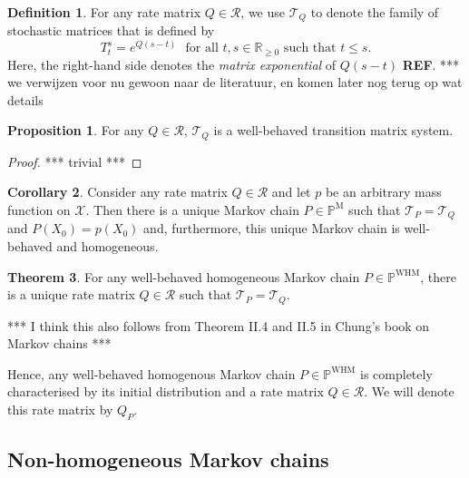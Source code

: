 \documentclass[10pt]{paper}
\theoremstyle{definition}
\newtheorem{theorem}{Theorem}
\newtheorem{proposition}[theorem]{Proposition}
\newtheorem{corollary}[theorem]{Corollary}
\newtheorem{definition}{Definition}
\newcommand{\reals}{\mathbb{R}}
\newcommand{\realsnonneg}{\reals_{\geq 0}}
\newcommand{\states}{\mathcal{X}}
\newcommand{\processes}{\mathbb{P}}
\newcommand{\mprocesses}{\processes^{\mathrm{M}}}
\newcommand{\whmprocesses}{\processes^{\mathrm{WHM}}}
\begin{document}
\begin{definition}\label{def:systemfromQ}For any rate matrix $Q\in\mathcal{R}$, we use $\mathcal{T}_Q$ to denote the family of stochastic matrices that is defined by
\begin{equation*}
T_t^s=e^{Q(s-t)}
\text{~~for all $t,s\in\realsnonneg$ such that $t\leq s$.}
\end{equation*}
Here, the right-hand side denotes the \emph{matrix exponential} of $Q(s-t)$ {\bf REF}. *** we verwijzen voor nu gewoon naar de literatuur, en komen later nog terug op wat details
\end{definition}

\begin{proposition}
\label{prop:systemQ}
For any $Q\in\mathcal{R}$, $\mathcal{T}_Q$ is a well-behaved transition matrix system.
\end{proposition}
\begin{proof}
*** trivial ***
\end{proof}

\begin{corollary}\label{cor:rate_has_unique_homogen_markov_process}
Consider any rate matrix $Q\in\mathcal{R}$ and let $p$ be an arbitrary mass function on $\states$. Then there is a unique Markov chain $P\in\mprocesses$ such that $\mathcal{T}_P=\mathcal{T}_Q$ and $P(X_0)=p(X_0)$ and, furthermore, this unique Markov chain is well-behaved and homogeneous.
\end{corollary}


\begin{theorem}\label{theo:homogeneoushasQ}
For any well-behaved homogeneous Markov chain $P\in\whmprocesses$, there is a unique rate matrix $Q\in\mathcal{R}$ such that $\mathcal{T}_P=\mathcal{T}_Q$.
\end{theorem}

*** I think this also follows from Theorem II.4 and II.5 in Chung's book on Markov chains ***

Hence, any well-behaved homogenous Markov chain $P\in\whmprocesses$ is completely characterised by its initial distribution and a rate matrix $Q\in\mathcal{R}$. We will denote this rate matrix by $Q_P$.

\subsection{Non-homogeneous Markov chains}
\end{document}
